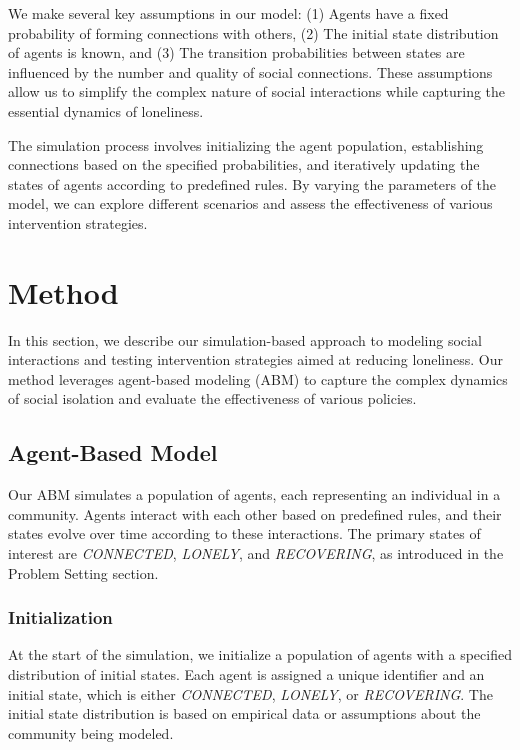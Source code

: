 \documentclass{article} %
\begin{document}
We make several key assumptions in our model: (1) Agents have a fixed probability of forming connections with others, (2) The initial state distribution of agents is known, and (3) The transition probabilities between states are influenced by the number and quality of social connections. These assumptions allow us to simplify the complex nature of social interactions while capturing the essential dynamics of loneliness.

The simulation process involves initializing the agent population, establishing connections based on the specified probabilities, and iteratively updating the states of agents according to predefined rules. By varying the parameters of the model, we can explore different scenarios and assess the effectiveness of various intervention strategies.

\section{Method}
\label{sec:method}

In this section, we describe our simulation-based approach to modeling social interactions and testing intervention strategies aimed at reducing loneliness. Our method leverages agent-based modeling (ABM) to capture the complex dynamics of social isolation and evaluate the effectiveness of various policies.

\subsection{Agent-Based Model}
\label{sec:abm}

Our ABM simulates a population of agents, each representing an individual in a community. Agents interact with each other based on predefined rules, and their states evolve over time according to these interactions. The primary states of interest are \textit{CONNECTED}, \textit{LONELY}, and \textit{RECOVERING}, as introduced in the Problem Setting section.

\subsubsection{Initialization}
\label{sec:initialization}

At the start of the simulation, we initialize a population of agents with a specified distribution of initial states. Each agent is assigned a unique identifier and an initial state, which is either \textit{CONNECTED}, \textit{LONELY}, or \textit{RECOVERING}. The initial state distribution is based on empirical data or assumptions about the community being modeled.
\end{document}
